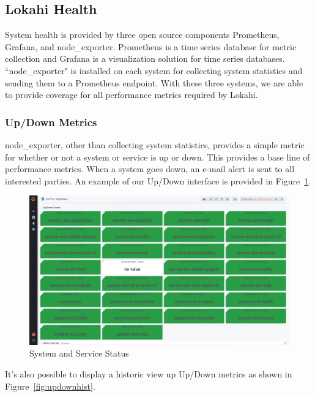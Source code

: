 \subsection{Lokahi Health}\label{subsec:lokahi-health}
System health is provided by three open source components Prometheus, Grafana, and node\_exporter. Prometheus is a time series database for metric collection and Grafana is a visualization solution for time series databases. ``node\_exporter" is installed on each system for collecting system statistics and sending them to a Prometheus endpoint. With these three systems, we are able to provide coverage for all performance metrics required by Lokahi.

\subsubsection{Up/Down Metrics}
node\_exporter, other than collecting system statistics, provides a simple metric for whether or not a system or service is up or down. This provides a base line of performance metrics. When a system goes down, an e-mail alert is sent to all interested parties. An example of our Up/Down interface is provided in Figure~\ref{fig:updown}.

\begin{figure}
	\centering
	\includegraphics[width=\linewidth]{figures/updown.png}
	\caption{System and Service Status}
	\label{fig:updown}
\end{figure}

It's also possible to display a historic view up Up/Down metrics as shown in Figure~\ref{fig:updownhist}.

